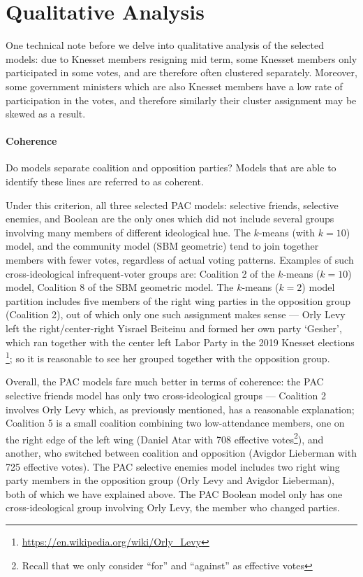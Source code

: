 \section{Qualitative Analysis}
\label{sec:qualitative_analysis}

One technical note before we delve into qualitative analysis of the selected
models: due to Knesset members resigning mid term, some Knesset members only participated in some votes, and are therefore often clustered separately.
Moreover, some government ministers which are also Knesset members have a low
rate of participation in the votes, and therefore similarly their cluster
assignment may be skewed as a result.

\paragraph{Coherence}
Do models separate coalition and opposition parties? Models that are able to identify these lines are referred to as coherent.

Under this criterion, all three selected PAC models: selective friends,
selective enemies, and Boolean are the only ones which did not include several
groups involving many members of different ideological hue.
The $k$-means (with $k=10$) model, and the community model (SBM geometric) tend to
join together members with fewer votes, regardless of actual voting patterns.
Examples of such cross-ideological infrequent-voter groups are: Coalition 2
of the $k$-means ($k=10$) model, Coalition 8 of the SBM geometric model.
The $k$-means ($k=2$) model partition includes five members of the right wing
parties in the opposition group (Coalition 2), out of which only one such
assignment makes sense --- Orly Levy left the right/center-right Yisrael
Beiteinu and formed her own party `Gesher', which ran together with the center
left Labor Party in the 2019 Knesset elections
\footnote{\url{https://en.wikipedia.org/wiki/Orly_Levy}}; so it is reasonable to
see her grouped together with the opposition group.

Overall, the PAC models fare much better in terms of coherence:
the PAC selective friends model has only two cross-ideological groups ---
Coalition 2 involves Orly Levy which, as previously mentioned, has a reasonable
explanation; Coalition 5 is a small coalition combining two low-attendance
members, one on the right edge of the left wing (Daniel Atar with 708 effective
votes\footnote{Recall that we only consider ``for'' and ``against'' as
effective votes}), and another, who switched between coalition and opposition
(Avigdor Lieberman with 725 effective votes).
The PAC selective enemies model includes two right wing party members in the
opposition group (Orly Levy and Avigdor Lieberman), both of which we have
explained above.
The PAC Boolean model only has one cross-ideological group involving Orly Levy,
the member who changed parties.

